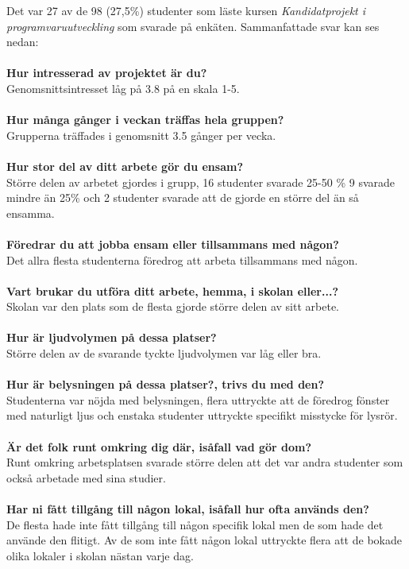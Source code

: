 Det var 27 av de 98 (27,5\%) studenter som läste kursen \textit{Kandidatprojekt i programvaruutveckling} som svarade på enkäten. Sammanfattade svar kan ses nedan:\\
\\\textbf{Hur intresserad av projektet är du?}\\ 
Genomsnittsintresset låg på 3.8 på en skala 1-5.\\\\
\textbf{Hur många gånger i veckan träffas hela gruppen?}\\
Grupperna träffades i genomsnitt 3.5 gånger per vecka.\\\\
\textbf{Hur stor del av ditt arbete gör du ensam?}\\
Större delen av arbetet gjordes i grupp, 16 studenter svarade 25-50 \% 9 svarade  mindre än 25\% och 2 studenter svarade att de gjorde en större del än så ensamma.\\\\
\textbf{Föredrar du att jobba ensam eller tillsammans med någon?}\\
Det allra flesta studenterna föredrog att arbeta tillsammans med någon.\\\\
\textbf{Vart brukar du utföra ditt arbete, hemma, i skolan eller...?}\\
Skolan var den plats som de flesta gjorde större delen av sitt arbete. \\\\
\textbf{Hur är ljudvolymen på dessa platser?}\\
Större delen av de svarande tyckte ljudvolymen var låg eller bra.\\\\
\textbf{Hur är belysningen på dessa platser?, trivs du med den?}\\
Studenterna var nöjda med belysningen, flera uttryckte att de föredrog fönster med naturligt ljus och enstaka studenter uttryckte specifikt misstycke för lysrör.\\\\
\textbf{Är det folk runt omkring dig där, isåfall vad gör dom?}\\
Runt omkring arbetsplatsen svarade större delen att det var andra studenter som också arbetade med sina studier.\\\\
\textbf{Har ni fått tillgång till någon lokal, isåfall hur ofta används den?}\\
De flesta hade inte fått tillgång till någon specifik lokal men de som hade det använde den flitigt. Av de som inte fått någon lokal uttryckte flera att de bokade olika lokaler i skolan nästan varje dag.\\\\
